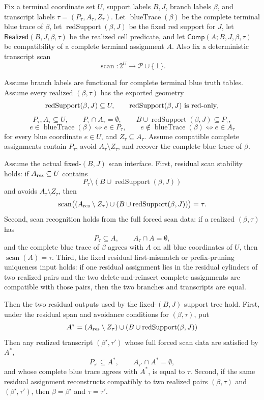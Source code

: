 \begin{helper}
Fix a terminal coordinate set \(U\), support labels \(B,J\), branch labels
\(\beta\), and transcript labels \(\tau=(P_\tau,A_\tau,Z_\tau)\).  Let
\(\operatorname{blueTrace}(\beta)\) be the complete terminal blue trace of
\(\beta\), let \(\operatorname{redSupport}(\beta,J)\) be the fixed red
support for \(J\), let \(\mathsf{Realized}(B,J,\beta,\tau)\) be the realized
cell predicate, and let \(\mathsf{Comp}(A;B,J,\beta,\tau)\) be compatibility
of a complete terminal assignment \(A\).  Also fix a deterministic transcript
scan
\[
\operatorname{scan}:2^U\to \mathcal P\cup\{\bot\}.
\]

Assume branch labels are functional for complete terminal blue truth tables.
Assume every realized \((\beta,\tau)\) has the exported geometry
\[
\operatorname{redSupport}(\beta,J)\subseteq U,\qquad
\operatorname{redSupport}(\beta,J)\hbox{ is red-only},
\]
\[
P_\tau,A_\tau\subseteq U,\qquad
P_\tau\cap A_\tau=\emptyset,\qquad
B\cup\operatorname{redSupport}(\beta,J)\subseteq P_\tau,
\]
\[
e\in\operatorname{blueTrace}(\beta)\Longleftrightarrow e\in P_\tau,
\qquad
e\notin\operatorname{blueTrace}(\beta)\Longleftrightarrow e\in A_\tau
\]
for every blue coordinate \(e\in U\), and \(Z_\tau\subseteq A_\tau\).
Assume compatible complete assignments contain \(P_\tau\), avoid
\(A_\tau\setminus Z_\tau\), and recover the complete blue trace of
\(\beta\).

Assume the actual fixed-\((B,J)\) scan interface.  First, residual scan
stability holds: if \(A_{\rm res}\subseteq U\) contains
\[
P_\tau\setminus(B\cup\operatorname{redSupport}(\beta,J))
\]
and avoids \(A_\tau\setminus Z_\tau\), then
\[
\operatorname{scan}\bigl((A_{\rm res}\setminus Z_\tau)\cup
  (B\cup\operatorname{redSupport}(\beta,J))\bigr)=\tau .
\]
Second, scan recognition holds from the full forced scan data: if a
realized \((\beta,\tau)\) has
\[
P_\tau\subseteq A,\qquad A_\tau\cap A=\emptyset,
\]
and the complete blue trace of \(\beta\) agrees with \(A\) on all blue
coordinates of \(U\), then \(\operatorname{scan}(A)=\tau\).  Third, the fixed residual
first-mismatch or prefix-pruning uniqueness input holds: if one residual
assignment lies in the residual cylinders of two realized pairs and the two
delete-and-reinsert complete assignments are compatible with those pairs,
then the two branches and transcripts are equal.

Then the two residual outputs used by the fixed-\((B,J)\) support tree hold.
First, under the residual span and avoidance conditions for
\((\beta,\tau)\), put
\[
A^\ast=(A_{\rm res}\setminus Z_\tau)\cup
  (B\cup\operatorname{redSupport}(\beta,J))
\]
Then any realized transcript \((\beta',\tau')\) whose full forced scan data
are satisfied by \(A^\ast\),
\[
P_{\tau'}\subseteq A^\ast,\qquad A_{\tau'}\cap A^\ast=\emptyset,
\]
and whose complete blue trace agrees with \(A^\ast\), is equal to
\(\tau\).  Second, if the same residual assignment reconstructs compatibly
to two realized pairs \((\beta,\tau)\) and \((\beta',\tau')\), then
\(\beta=\beta'\) and \(\tau=\tau'\).
\end{helper}
